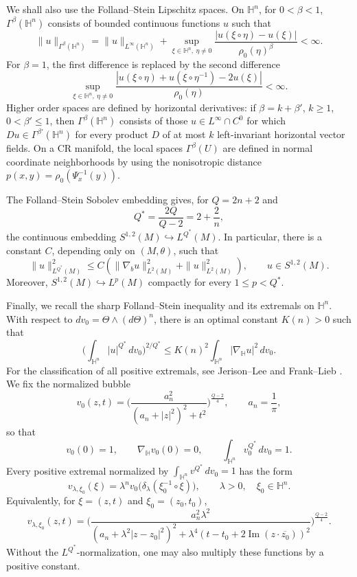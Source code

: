 \documentclass[11pt]{article}
\numberwithin{equation}{section}
\numberwithin{equation}{section}
\begin{document}
	We shall also use the Folland--Stein Lipschitz spaces. On \(\mathbb H^n\), for \(0<\beta<1\), \(\Gamma^\beta(\mathbb H^n)\) consists of bounded continuous functions \(u\) such that
	\[
	\|u\|_{\Gamma^\beta(\mathbb H^n)} =\|u\|_{L^\infty(\mathbb H^n)} +\sup_{\xi\in\mathbb H^n,\ \eta\ne0} \frac{|u(\xi\circ\eta)-u(\xi)|}{\rho_0(\eta)^\beta} <\infty.
	\]
	For \(\beta=1\), the first difference is replaced by the second difference
	\[
	\sup_{\xi\in\mathbb H^n,\ \eta\ne0} \frac{|u(\xi\circ\eta)+u(\xi\circ\eta^{-1})-2u(\xi)|}{\rho_0(\eta)}<\infty.
	\]
	Higher order spaces are defined by horizontal derivatives: if \(\beta=k+\beta'\), \(k\ge1\), \(0<\beta'\le1\), then \(\Gamma^\beta(\mathbb H^n)\) consists of those \(u\in L^\infty\cap C^0\) for which \(Du\in\Gamma^{\beta'}(\mathbb H^n)\) for every product \(D\) of at most \(k\) left-invariant horizontal vector fields. On a CR manifold, the local spaces \(\Gamma^\beta(U)\) are defined in normal coordinate neighborhoods by using the nonisotropic distance \(p(x,y)=\rho_0(\Psi_x^{-1}(y))\).
	
	The Folland--Stein Sobolev embedding gives, for \(Q=2n+2\) and
	\[
	Q^*=\frac{2Q}{Q-2}=2+\frac2n,
	\]
	the continuous embedding \(S^{1,2}(M)\hookrightarrow L^{Q^*}(M)\). In particular, there is a constant \(C\), depending only on \((M,\theta)\), such that
	\[
	\|u\|_{L^{Q^*}(M)}^2 \le C(\|\nabla_bu\|_{L^2(M)}^2+\|u\|_{L^2(M)}^2), \qquad u\in S^{1,2}(M).
	\]
	Moreover, \(S^{1,2}(M)\hookrightarrow L^p(M)\) compactly for every \(1\le p<Q^*\).
	
	Finally, we recall the sharp Folland--Stein inequality and its extremals on \(\mathbb H^n\). With respect to \(dv_0=\Theta\wedge(d\Theta)^n\), there is an optimal constant \(K(n)>0\) such that
	\[
	\Big(\int_{\mathbb H^n}|u|^{Q^*}\,dv_0\Big)^{2/Q^*} \le K(n)^2\int_{\mathbb H^n}|\nabla_{\mathbb H}u|^2\,dv_0.
	\]
	For the classification of all positive extremals, see Jerison--Lee \cite{JL1988} and Frank--Lieb \cite{FL2012}. We fix the normalized bubble
	\[
	v_0(z,t)= \Big(\frac{a_n^2}{(a_n+|z|^2)^2+t^2}\Big)^{\frac{Q-2}{4}}, \qquad a_n=\frac1\pi,
	\]
	so that
	\[
	v_0(0)=1,\qquad \nabla_{\mathbb H}v_0(0)=0,\qquad \int_{\mathbb H^n}v_0^{Q^*}\,dv_0=1.
	\]
	Every positive extremal normalized by \(\int_{\mathbb H^n}v^{Q^*}\,dv_0=1\) has the form
	\[
	v_{\lambda,\xi_0}(\xi) =\lambda^n v_0\bigl(\delta_\lambda(\xi_0^{-1}\circ\xi)\bigr), \qquad \lambda>0,\quad \xi_0\in\mathbb H^n.
	\]
	Equivalently, for \(\xi=(z,t)\) and \(\xi_0=(z_0,t_0)\),
	\[
	v_{\lambda,\xi_0}(z,t)= \Big( \frac{a_n^2\lambda^2} {(a_n+\lambda^2|z-z_0|^2)^2 +\lambda^4(t-t_0+2\operatorname{Im}(z\cdot\overline{z_0}))^2} \Big)^{\frac{Q-2}{4}}.
	\]
	Without the \(L^{Q^*}\)-normalization, one may also multiply these functions by a positive constant.
	
\end{document}
